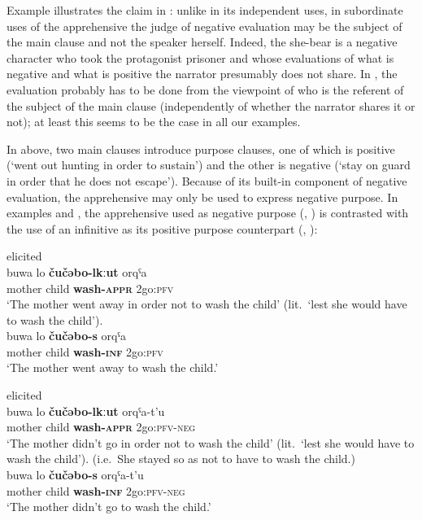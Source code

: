 \documentclass[output=paper,colorlinks,citecolor=brown]{langscibook}
\begin{document}
\noindent Example  illustrates the claim in \citet{vuillermet2018a}: unlike in its independent uses, in subordinate uses of the apprehensive the judge of negative evaluation may be the subject of the main clause and not the speaker herself. Indeed, the she-bear is a negative character who took the protagonist prisoner and whose evaluations of what is negative and what is positive the narrator presumably does not share. In , the evaluation probably has to be done from the viewpoint of who is the referent of the subject of the main clause (independently of whether the narrator shares it or not); at least this seems to be the case in all our examples. 

In  above, two main clauses introduce purpose clauses, one of which is positive (`went out hunting in order to sustain') and the other is negative (`stay on guard in order that he does not escape'). Because of its built-in component of negative evaluation, the apprehensive may only be used to express negative purpose. In examples  and , the apprehensive used as negative purpose (, ) is contrasted with the use of an infinitive as its positive purpose counterpart (, ):
 

\ea \label{ex:DD14} \textnormal{elicited} \\
\ea \label{ex:DD14a}
\gll buwa lo \textbf{čučəbo-lkːut} o{\textlangle}r{\textrangle}qˤa \\
mother child \textbf{wash-\textsc{appr}} {\textlangle}2{\textrangle}go:\textsc{pfv} \\
\glt `The mother went away in order not to wash the child' (lit.\ `lest she would have to wash the child'). \\
\ex \label{ex:DD14b}
\gll buwa lo \textbf{čučəbo-s} o{\textlangle}r{\textrangle}qˤa \\
mother child \textbf{wash-\textsc{inf}} {\textlangle}2{\textrangle}go:\textsc{pfv} \\
\glt `The mother went away to wash the child.'
\z
\z


\ea \label{ex:DD15} \textnormal{elicited} \\
\ea \label{ex:DD15a}
\gll buwa lo \textbf{čučəbo-lkːut} o{\textlangle}r{\textrangle}qˤa-t'u \\
mother child \textbf{wash-\textsc{appr}} {\textlangle}2{\textrangle}go:\textsc{pfv-neg}\\
\glt `The mother didn't go in order not to wash the child' (lit.\ `lest she would have to wash the child'). (i.e.\   She stayed so as not to have to wash the child.)\\
\ex \label{ex:DD15b}
\gll buwa lo \textbf{čučəbo-s} o{\textlangle}r{\textrangle}qˤa-t'u \\
mother child \textbf{wash-\textsc{inf}} {\textlangle}2{\textrangle}go:\textsc{pfv-neg}\\
\glt `The mother didn't go to wash the child.'
\z
\z
\end{document}
